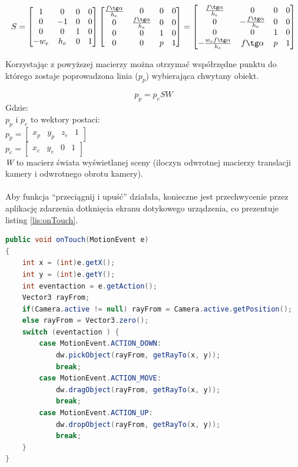 \begin{equation}
S = 
\begin{bmatrix}1&0&0&0\\0&-1&0&0\\0&0&1&0\\-w_{e}&h_{e}&0&1\end{bmatrix}
\begin{bmatrix}\frac{f \tg \alpha}{h_{e}}&0&0&0\\0&\frac{f \tg
\alpha}{h_{e}}&0&0\\0&0&1&0\\0&0&p&1\end{bmatrix} =
\begin{bmatrix}\frac{f \tg \alpha}{h_{e}}&0&0&0\\0&-\frac{f \tg
\alpha}{h_{e}}&0&0\\0&0&1&0\\-\frac{w_{e}f \tg \alpha}{h_{e}}&f \tg \alpha&p&1\end{bmatrix}
\end{equation}

Korzystając z powyższej macierzy można otrzymać współrzędne punktu do którego
zostaje poprowadzona linia ($ p_{p} $) wybierająca chwytany obiekt.

\begin{equation}
p_{p} = p_{e} S W
\label{eq:transform}
\end{equation}
Gdzie:\\
$ p_{p} $ i $ p_{e} $ to wektory postaci:\\
$ p_{p} = \begin{bmatrix}x_{p}&y_{p}&z_{e}&1\end{bmatrix} $ \\
$ p_{e} = \begin{bmatrix}x_{e}&y_{e}&0&1\end{bmatrix} $ \\
\emph{W} to macierz świata wyświetlanej sceny (iloczyn odwrotnej macierzy
translacji kamery i odwrotnego obrotu kamery).\\
\\
\newpage
Aby funkcja ``przeciągnij i upuść'' działała, konieczne jest przechwycenie przez
aplikację zdarzenia dotknięcia ekranu dotykowego urządzenia, co prezentuje
listing \ref{lis:onTouch}.

\begin{lstlisting}[language=java, caption=Przechwycenie zdarzenia
dotknięcia ekranu.,label=lis:onTouch]public void onTouch(MotionEvent e)
{
	int x = (int)e.getX();
	int y = (int)e.getY();
	int eventaction = e.getAction();
	Vector3 rayFrom;
	if(Camera.active != null) rayFrom = Camera.active.getPosition();
	else rayFrom = Vector3.zero();
    switch (eventaction ) { 
    	case MotionEvent.ACTION_DOWN:
    		dw.pickObject(rayFrom, getRayTo(x, y));
    		break;
    	case MotionEvent.ACTION_MOVE:
    		dw.dragObject(rayFrom, getRayTo(x, y));
    		break;
    	case MotionEvent.ACTION_UP:
    		dw.dropObject(rayFrom, getRayTo(x, y));
    		break;
    }
}
\end{lstlisting}


